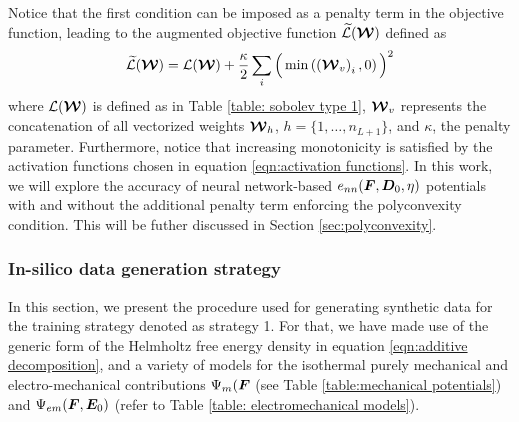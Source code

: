 Notice that the first condition can be imposed as a penalty term in the objective function, leading to the augmented objective function $\widetilde{\mathcal{L}}(\boldsymbol{\mathcal{W}})$ defined as
%
\begin{equation}
	\widetilde{\mathcal{L}}(\boldsymbol{\mathcal{W}})=\mathcal{L}(\boldsymbol{\mathcal{W}}) + \frac{\kappa}{2} \sum_{i}\Big(\min\left(\left(\boldsymbol{\mathcal{W}}_v\right)_i,0\right)\Big)^2
\end{equation}
%
where $\mathcal{L}(\boldsymbol{\mathcal{W}})$ is defined as in Table \ref{table: sobolev type 1}, $\boldsymbol{\mathcal{W}}_v$ represents the concatenation of all vectorized weights $\boldsymbol{\mathcal{W}}_h$, $h=\{1,\dots,n_{L+1}\}$, and $\kappa$, the penalty parameter. Furthermore, notice that increasing monotonicity is satisfied by the activation functions chosen in equation \eqref{eqn:activation functions}. In this work, we will explore the accuracy of neural network-based $e_{nn}(\boldsymbol{F},\boldsymbol{D}_0,\eta)$ potentials with and without the additional penalty term enforcing the polyconvexity condition. This will be futher discussed in Section \ref{sec:polyconvexity}.





\subsubsection{In-silico data generation strategy}\label{sec:data generation strategy 1}

In this section, we present the procedure used for generating synthetic data for the training strategy denoted as strategy 1. For that, we have made use of the generic form of the Helmholtz free energy density in equation \eqref{eqn:additive decomposition}, and a variety of models for the isothermal purely mechanical and electro-mechanical contributions $\Psi_m(\boldsymbol{F}$ (see Table \ref{table:mechanical potentials}) and $\Psi_{em}(\boldsymbol{F},\boldsymbol{E}_0)$ (refer to Table \ref{table: electromechanical models}).

